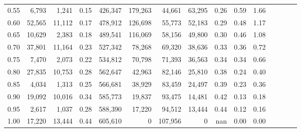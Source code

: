 \begin{tabular}{rrrcrrrrrrrrrrr}
0.55 &   6,793 &   1,241 &                                       0.15 &  426,347 &  179,263 &   44,661 &   63,295 &  0.26 &  0.59 &                         1.66 \\
0.60 &  52,565 &  11,112 &                                       0.17 &  478,912 &  126,698 &   55,773 &   52,183 &  0.29 &  0.48 &                         1.17 \\
0.65 &  10,629 &   2,383 &                                       0.18 &  489,541 &  116,069 &   58,156 &   49,800 &  0.30 &  0.46 &                         1.08 \\
0.70 &  37,801 &  11,164 &                                       0.23 &  527,342 &   78,268 &   69,320 &   38,636 &  0.33 &  0.36 &                         0.72 \\
0.75 &   7,470 &   2,073 &                                       0.22 &  534,812 &   70,798 &   71,393 &   36,563 &  0.34 &  0.34 &                         0.66 \\
0.80 &  27,835 &  10,753 &                                       0.28 &  562,647 &   42,963 &   82,146 &   25,810 &  0.38 &  0.24 &                         0.40 \\
0.85 &   4,034 &   1,313 &                                       0.25 &  566,681 &   38,929 &   83,459 &   24,497 &  0.39 &  0.23 &                         0.36 \\
0.90 &  19,092 &  10,016 &                                       0.34 &  585,773 &   19,837 &   93,475 &   14,481 &  0.42 &  0.13 &                         0.18 \\
0.95 &   2,617 &   1,037 &                                       0.28 &  588,390 &   17,220 &   94,512 &   13,444 &  0.44 &  0.12 &                         0.16 \\
1.00 &  17,220 &  13,444 &                                       0.44 &  605,610 &        0 &  107,956 &        0 &   nan &  0.00 &                         0.00 \\
\bottomrule
\end{tabular}
